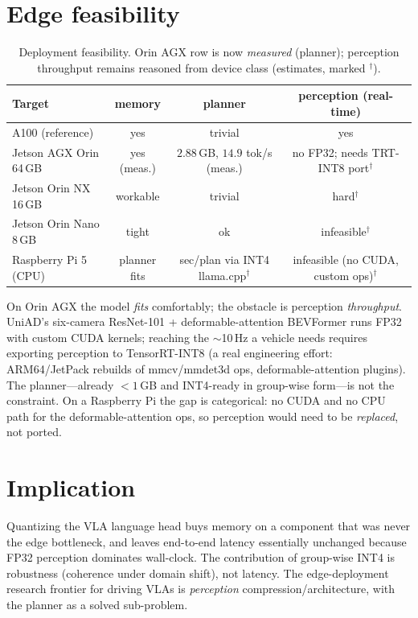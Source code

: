 \documentclass[conference]{IEEEtran}
\begin{document}
\section{Edge feasibility}
\begin{table}[t]\centering
\caption{Deployment feasibility. Orin AGX row is now \emph{measured} (planner); perception
throughput remains reasoned from device class (estimates, marked $^\dagger$).}
\begin{tabular}{lccc}
\toprule
Target & memory & planner & perception (real-time) \\
\midrule
A100 (reference)      & yes & trivial & yes \\
Jetson AGX Orin 64\,GB & yes (meas.) & $2.88$\,GB, $14.9$ tok/s (meas.) & no FP32; needs TRT-INT8 port$^\dagger$ \\
Jetson Orin NX 16\,GB & workable & trivial & hard$^\dagger$ \\
Jetson Orin Nano 8\,GB & tight & ok & infeasible$^\dagger$ \\
Raspberry Pi 5 (CPU) & planner fits & sec/plan via INT4 llama.cpp$^\dagger$ & infeasible (no CUDA, custom ops)$^\dagger$ \\
\bottomrule
\end{tabular}
\end{table}
On Orin AGX the model \emph{fits} comfortably; the obstacle is perception \emph{throughput}.
UniAD's six-camera ResNet-101 + deformable-attention BEVFormer runs FP32 with custom CUDA kernels;
reaching the $\sim$10\,Hz a vehicle needs requires exporting perception to TensorRT-INT8 (a real
engineering effort: ARM64/JetPack rebuilds of mmcv/mmdet3d ops, deformable-attention plugins). The
planner---already $<1$\,GB and INT4-ready in group-wise form---is not the constraint. On a Raspberry
Pi the gap is categorical: no CUDA and no CPU path for the deformable-attention ops, so perception
would need to be \emph{replaced}, not ported.

\section{Implication}
Quantizing the VLA language head buys memory on a component that was never the edge bottleneck, and
leaves end-to-end latency essentially unchanged because FP32 perception dominates wall-clock. The
contribution of group-wise INT4 is robustness (coherence under domain shift), not latency. The
edge-deployment research frontier for driving VLAs is \emph{perception} compression/architecture,
with the planner as a solved sub-problem.
\end{document}
